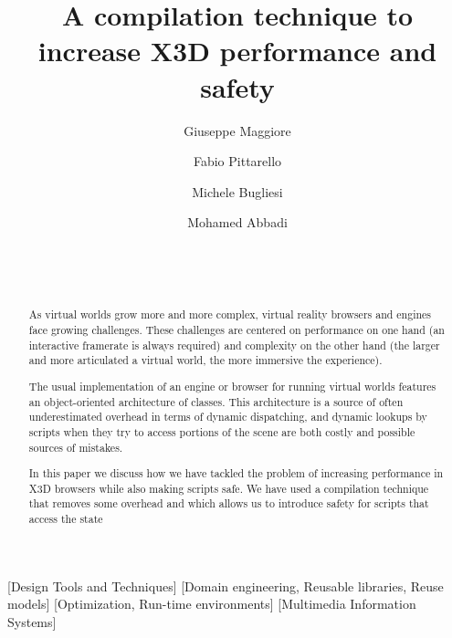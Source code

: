 \documentclass{sig-alternate}
\begin{document}
\title{A compilation technique to increase X3D performance and safety}

\author{
Giuseppe Maggiore \and Fabio Pittarello \and Michele Bugliesi \and Mohamed Abbadi\\
       \\
       \\
       \\
}

\date{}

\maketitle

\begin{abstract}
As virtual worlds grow more and more complex, virtual reality browsers and engines face growing challenges. These challenges are centered on performance on one hand (an interactive framerate is always required) and complexity on the other hand (the larger and more articulated a virtual world, the more immersive the experience).

The usual implementation of an engine or browser for running virtual worlds features an object-oriented architecture of classes. This architecture is a source of often underestimated overhead in terms of dynamic dispatching, and dynamic lookups by scripts when they try to access portions of the scene are both costly and possible sources of mistakes.

In this paper we discuss how we have tackled the problem of increasing performance in X3D browsers while also making scripts safe. We have used a compilation technique that removes some overhead and which allows us to introduce safety for scripts that access the state
\end{abstract}

[Design Tools and Techniques]
[Domain engineering, Reusable libraries, Reuse models]
[Optimization, Run-time environments]
[Multimedia Information Systems]
\end{document}
